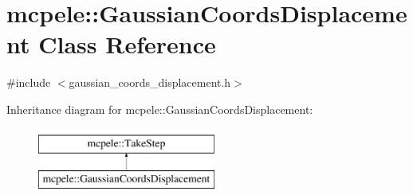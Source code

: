 \hypertarget{classmcpele_1_1GaussianCoordsDisplacement}{\section{mcpele\-:\-:\-Gaussian\-Coords\-Displacement \-Class \-Reference}
\label{classmcpele_1_1GaussianCoordsDisplacement}
}


{\ttfamily \#include $<$gaussian\-\_\-coords\-\_\-displacement.\-h$>$}

\-Inheritance diagram for mcpele\-:\-:\-Gaussian\-Coords\-Displacement\-:\begin{figure}[H]
\begin{center}
\leavevmode
\includegraphics[height=2.000000cm]{classmcpele_1_1GaussianCoordsDisplacement}
\end{center}
\end{figure}
